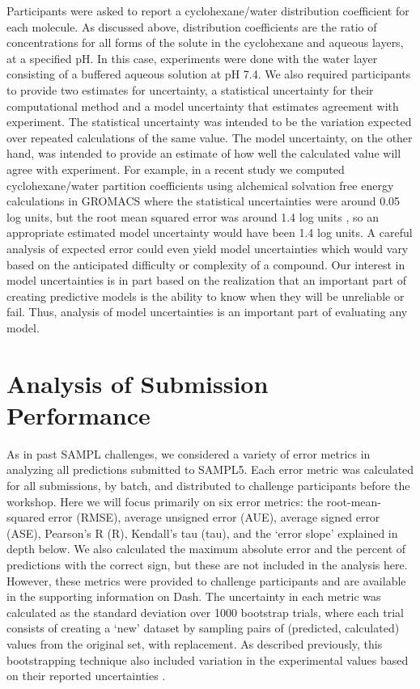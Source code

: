 Participants were asked to report a cyclohexane/water distribution coefficient for each molecule. 
As discussed above, distribution coefficients are the ratio of concentrations for all forms of the solute in the cyclohexane and aqueous layers, at a specified pH. 
In this case, experiments were done with the water layer consisting of a buffered aqueous solution at pH 7.4. 
We also required participants to provide two estimates for uncertainty, a statistical uncertainty for their computational method and a model uncertainty that estimates agreement with experiment.  
The statistical uncertainty was intended to be the variation expected over repeated calculations of the same value. 
The model uncertainty, on the other hand, was intended to provide an estimate of how well the calculated value will agree with experiment. 
For example, in a recent study we computed cyclohexane/water partition coefficients using alchemical solvation free energy calculations in GROMACS where the statistical uncertainties were around 0.05 log units,
but the root mean squared error was around 1.4 log units  \cite{Bannan:2016lp}, so an appropriate estimated model uncertainty would have been 1.4 log units. A careful analysis of expected error could even yield model uncertainties which would vary based on the anticipated difficulty or complexity of a compound. 
Our interest in model uncertainties is in part based on the realization that an important part of creating predictive models is the ability to know when they will be unreliable or fail. 
Thus, analysis of model uncertainties is an important part of evaluating any model. 

\section{Analysis of Submission Performance}
\label{analysisMethods}

As in past SAMPL challenges, we considered a variety of error metrics in analyzing all predictions submitted to SAMPL5. 
Each error metric was calculated for all submissions, by batch, and distributed to challenge participants before the workshop. %
Here we will focus primarily on six error metrics: the root-mean-squared error (RMSE), average unsigned error (AUE), average signed error (ASE), Pearson's R (R), Kendall's tau (tau), and the `error slope' explained in depth below. 
We also calculated the maximum absolute error and the percent of predictions with the correct sign, but these are not included in the analysis here.
However, these metrics were provided to challenge participants and are available in the supporting information on Dash.
The uncertainty in each metric was calculated as the standard deviation over 1000 bootstrap trials, where each trial consists of creating a `new' dataset by sampling pairs of (predicted, calculated) values from the original set, with replacement. 
As described previously, this bootstrapping technique also included variation in the experimental values based on their reported uncertainties \cite{Mobley:2014gu}.


